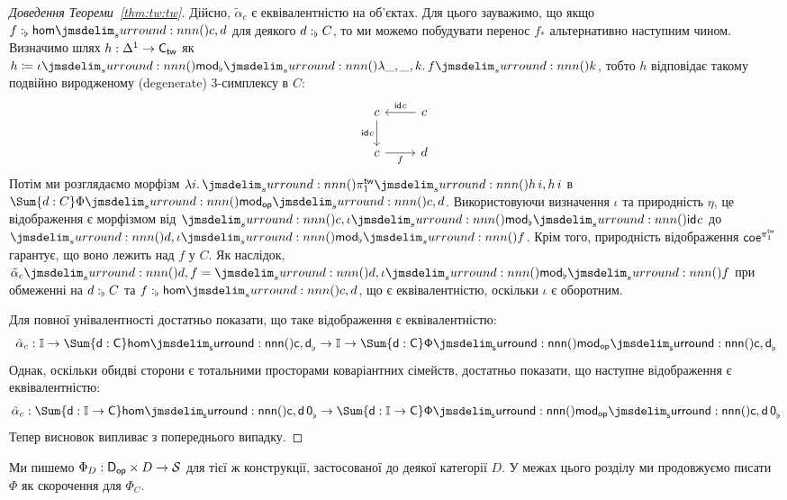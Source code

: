 \documentclass[12pt]{article}
\newcommand{\Space}{\mathcal{S}}
\newcommand{\GM}{\flat}
\newcommand{\OM}{\mathsf{op}}
\newcommand{\TM}{\mathsf{tw}}
\let\prn\DelimPrn
\begin{document}
\begin{proof}[Доведення Теореми~\ref{thm:tw:tw}]
  Дійсно, $\tilde\alpha_c$ є еквівалентністю на об'єктах. Для цього зауважимо, що якщо
  $\DeclVar{f}{\GM}{\Hom{c}{d}}$ для деякого
  $\DeclVar{d}{\GM}{C}$, то ми можемо побудувати перенос $f_*$ альтернативно наступним чином.
  Визначимо шлях $h : \Delta^1 \to \Modify[\TM]{C}$ як $h \defeq\iota{\prn{\MkMod[\GM]{\lambda \_, \_, k.\, f\prn{k}}}}$,
  тобто
  $h$ відповідає такому подвійно виродженому (degenerate) 3-симплексу в $C$:
  \[
    \begin{tikzcd}
      c\ar[d,"\ArrId{c}"'] & c\ar[l,"\ArrId{c}"'] \\
      c\ar[r,"f"'] & d
    \end{tikzcd}
  \]
  Потім ми розглядаємо морфізм $\lambda i.\,\prn{\pi^\TM_1\prn{h\,i}, h\,i}$ в
  $\Sum{d : C} \Phi\prn{\MkMod[\OM]{c},d}$. Використовуючи визначення $\iota$ та природність
  $\eta$, це відображення є морфізмом від $\prn{c,\iota\prn{\MkMod[\GM]{\ArrId{c}}}}$ до
  $\prn{d, \iota\prn{\MkMod[\GM]{f}}}$. Крім того, природність відображення $\Coe^{\pi_1^{\TM}}$ гарантує,
  що воно лежить над $f$ у $C$. Як наслідок,
  $\tilde{\alpha}_c\prn{d,f} = \prn{d,\iota\prn{\MkMod[\GM]{f}}}$ при обмеженні на
  $\DeclVar{d}{\GM}{C}$ та $\DeclVar{f}{\GM}{\Hom{c}{d}}$, що є еквівалентністю, оскільки $\iota$
  є оборотним.

  Для повної унівалентності достатньо показати, що таке відображення є еквівалентністю:
  \[
    \tilde{\alpha}_c :
    \Modify[\GM]{\Int \to \Sum{d : C} \Hom{c}{d}}
    \to
    \Modify[\GM]{\Int \to \Sum{d : C} \Phi\prn{\MkMod[\OM]{c},d}}
  \]
  Однак, оскільки обидві сторони є тотальними просторами коваріантних сімейств, достатньо показати, що
  наступне відображення є еквівалентністю:
  \[
    \tilde{\alpha}_c :
    \Modify[\GM]{\Sum{d : \Int \to C} \Hom{c}{d\,0}}
    \to
    \Modify[\GM]{\Sum{d : \Int \to C} \Phi\prn{\MkMod[\OM]{c},d\,0}}
  \]
  Тепер висновок випливає з попереднього випадку.
\end{proof}

\begin{nota}
  Ми пишемо $\Phi_D : \Modify[\OM]{D} \times D \to \Space$ для тієї ж конструкції, застосованої до деякої категорії $D$. У межах цього розділу ми продовжуємо писати $\Phi$ як скорочення для $\Phi_C$.
\end{nota}
\end{document}
